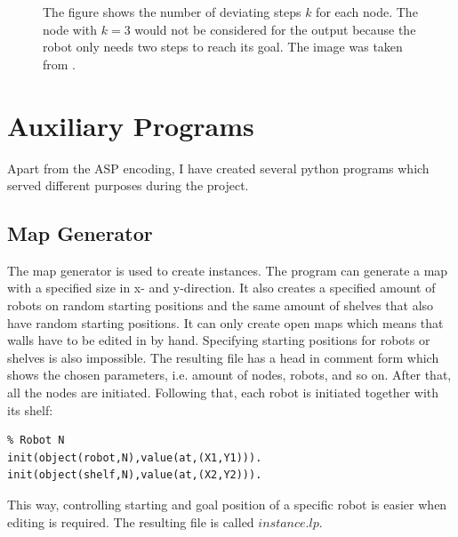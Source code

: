 \documentclass[runningheads]{llncs}
\begin{document}
\begin{figure}[h]
\caption{The figure shows the number of deviating steps $k$ for each node. The node with $k=3$ would not be considered for the output because the robot only needs two steps to reach its goal. The image was taken from \cite{rn}.}
\label{fig:rn}
\end{figure}

\section{Auxiliary Programs}
Apart from the ASP encoding, I have created several python programs which served different purposes during the project.
\subsection{Map Generator}
The map generator is used to create instances. The program can generate a map with a specified size in x- and y-direction. It also creates a specified amount of robots on random starting positions and the same amount of shelves that also have random starting positions. It can only create open maps which means that walls have to be edited in by hand. Specifying starting positions for robots or shelves is also impossible. The resulting file has a head in comment form which shows the chosen parameters, i.e. amount of nodes, robots, and so on. After that, all the nodes are initiated. Following that, each robot is initiated together with its shelf:
\begin{verbatim}
% Robot N
init(object(robot,N),value(at,(X1,Y1))).
init(object(shelf,N),value(at,(X2,Y2))).
\end{verbatim}
This way, controlling starting and goal position of a specific robot is easier when editing is required. The resulting file is called $instance.lp$.
\end{document}
